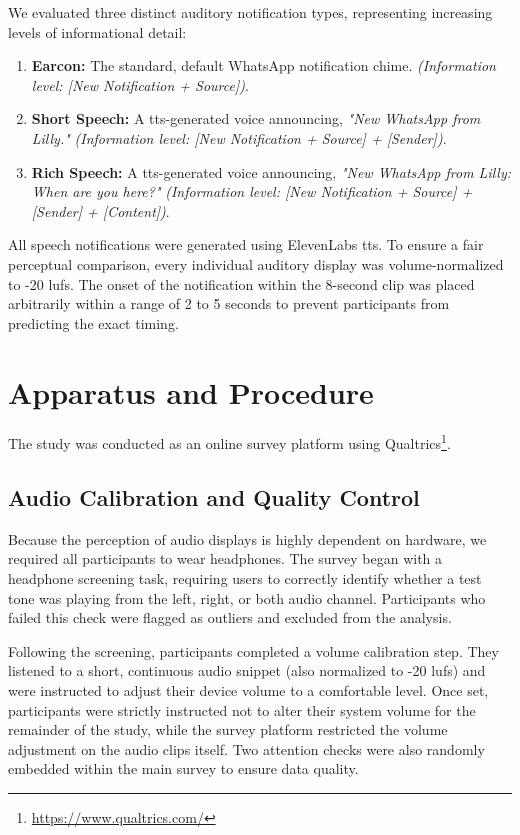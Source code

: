 We evaluated three distinct auditory notification types, representing increasing levels of informational detail:
\begin{enumerate}
    \item \textbf{Earcon:} The standard, default WhatsApp notification chime. \textit{(Information level: [New Notification + Source])}.
    \item \textbf{Short Speech:} A \gls{tts}-generated voice announcing, \textit{"New WhatsApp from Lilly."} \textit{(Information level: [New Notification + Source] + [Sender])}.
    \item \textbf{Rich Speech:} A \gls{tts}-generated voice announcing, \textit{"New WhatsApp from Lilly: When are you here?"} \textit{(Information level: [New Notification + Source] + [Sender] + [Content])}.
\end{enumerate}

All speech notifications were generated using ElevenLabs \gls{tts}. To ensure a fair perceptual comparison, every individual auditory display was volume-normalized to -20 \gls{lufs}. The onset of the notification within the 8-second clip was placed arbitrarily within a range of 2 to 5 seconds to prevent participants from predicting the exact timing. 

\section{Apparatus and Procedure}
\label{sec:apparatus_procedure}
The study was conducted as an online survey platform using Qualtrics\footnote{\url{https://www.qualtrics.com/}}. 

\subsection{Audio Calibration and Quality Control}
Because the perception of audio displays is highly dependent on hardware, we required all participants to wear headphones. The survey began with a headphone screening task, requiring users to correctly identify whether a test tone was playing from the left, right, or both audio channel. Participants who failed this check were flagged as outliers and excluded from the analysis. 

Following the screening, participants completed a volume calibration step. They listened to a short, continuous audio snippet (also normalized to -20 \gls{lufs}) and were instructed to adjust their device volume to a comfortable level. Once set, participants were strictly instructed not to alter their system volume for the remainder of the study, while the survey platform restricted the volume adjustment on the audio clips itself. Two attention checks were also randomly embedded within the main survey to ensure data quality.

